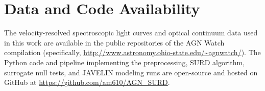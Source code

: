 \documentclass[fleqn,usenatbib]{mnras}
\begin{document}
\section*{Data and Code Availability}
The velocity-resolved spectroscopic light curves and optical continuum data used in this work are available in the public repositories of the AGN Watch compilation (specifically, \url{http://www.astronomy.ohio-state.edu/~agnwatch/}). The Python code and pipeline implementing the preprocessing, SURD algorithm, surrogate null tests, and JAVELIN modeling runs are open-source and hosted on GitHub at \url{https://github.com/am610/AGN_SURD}.




%
%

\label{lastpage}
\end{document}
